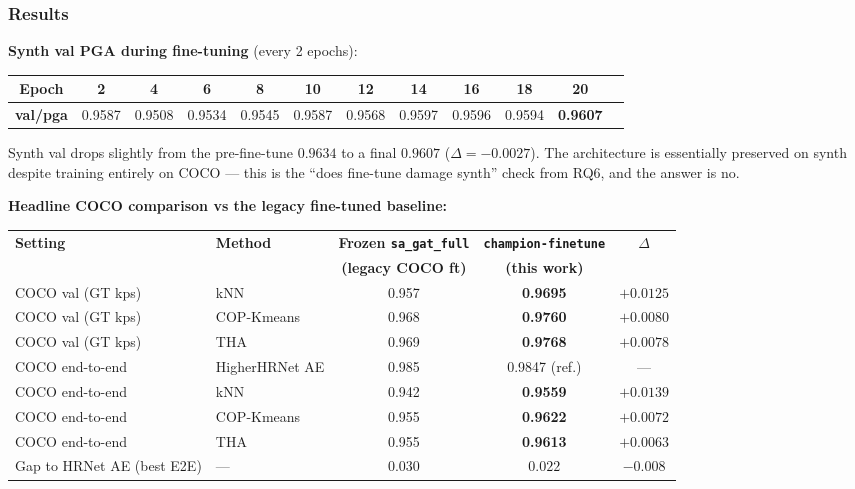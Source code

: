 \subsubsection{Results}

\textbf{Synth val PGA during fine-tuning} (every 2 epochs):

\begin{tabular}{cccccccccccc}
\hline
\textbf{Epoch}    &  2  &  4  &  6  &  8  & 10  & 12  & 14  & 16  & 18  & 20  \\
\hline
\textbf{val/pga}  & 0.9587 & 0.9508 & 0.9534 & 0.9545 & 0.9587 & 0.9568 & 0.9597 & 0.9596 & 0.9594 & \textbf{0.9607} \\
\hline
\end{tabular}

\vspace{0.5em}

Synth val drops slightly from the pre-fine-tune $0.9634$ to a final $0.9607$ ($\Delta = -0.0027$). The architecture is essentially preserved on synth despite training entirely on COCO --- this is the ``does fine-tune damage synth'' check from RQ6, and the answer is no.

\textbf{Headline COCO comparison vs the legacy fine-tuned baseline:}

\begin{tabular}{llccc}
\hline
\textbf{Setting} & \textbf{Method} & \textbf{Frozen \texttt{sa\_gat\_full}} & \textbf{\texttt{champion-finetune}} & \textbf{$\Delta$} \\
                 &                  & \textbf{(legacy COCO ft)}              & \textbf{(this work)}                 &                   \\
\hline
COCO val (GT kps) & kNN          & 0.957  & \textbf{0.9695} & $+0.0125$ \\
COCO val (GT kps) & COP-Kmeans   & 0.968  & \textbf{0.9760} & $+0.0080$ \\
COCO val (GT kps) & THA          & 0.969  & \textbf{0.9768} & $+0.0078$ \\
\hline
COCO end-to-end   & HigherHRNet AE   & 0.985  & 0.9847 (ref.) & --- \\
COCO end-to-end   & kNN          & 0.942  & \textbf{0.9559} & $+0.0139$ \\
COCO end-to-end   & COP-Kmeans   & 0.955  & \textbf{0.9622} & $+0.0072$ \\
COCO end-to-end   & THA          & 0.955  & \textbf{0.9613} & $+0.0063$ \\
\hline
Gap to HRNet AE (best E2E) & ---  & $0.030$ & $\mathbf{0.022}$ & $-0.008$ \\
\hline
\end{tabular}

